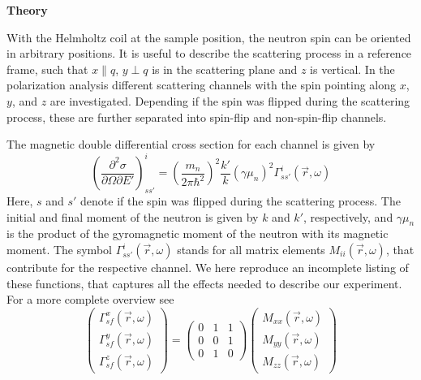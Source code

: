 \vspace{10 pt}
\noindent
{\bf Theory}

\noindent
%
With the Helmholtz coil at the sample position, the neutron spin can be
oriented in arbitrary positions. It is useful to describe the scattering
process in a reference frame, such that $x\parallel q$, $y\perp q$ is in the
scattering plane and $z$ is vertical.
%
In the polarization analysis different scattering channels with the spin
pointing along $x$, $y$, and $z$ are investigated. Depending if the spin was flipped
during the scattering process, these are further separated
into spin-flip and non-spin-flip channels.

\noindent
The magnetic double differential cross section for each channel is given by
\cite{Schaerpf_1993}
%
\begin{equation}
  \left(\frac{\partial^2\sigma}{\partial \Omega \partial E'}\right)_{ss'}^{i}
  = \left( \frac{m_n}{2\pi\hbar^2}\right)^2 \frac{k'}{k} (\gamma \mu_n)^2
    \Gamma_{ss'}^{i}(\vec{r},\omega)
\end{equation}
%
Here, $s$ and $s'$
denote if the spin was flipped during the scattering process. The initial and
final moment of the neutron is given by $k$ and $k'$, respectively, and $\gamma
\mu_n$ is the product of the gyromagnetic moment of the neutron with its
magnetic moment. The symbol $\Gamma_{ss'}^{i}(\vec{r},\omega)$ stands for all
matrix elements $M_{ii}(\vec{r},\omega)$, that contribute for the respective
channel. We here reproduce an incomplete listing of these functions, that
captures all the effects needed to describe our experiment. For a more complete
overview see \cite{Schaerpf_1993}
%
\begin{equation}
  \begin{pmatrix}
    \Gamma_{sf}^x (\vec{r},\omega)\\
    \Gamma_{sf}^y (\vec{r},\omega)\\
    \Gamma_{sf}^ z (\vec{r},\omega)
  \end{pmatrix}
  =
  \begin{pmatrix}
    0 & 1 & 1 \\
    0 & 0 & 1 \\ 
    0 & 1 & 0 
  \end{pmatrix}
  \begin{pmatrix}
    M_{xx}(\vec{r},\omega) \\
    M_{yy}(\vec{r},\omega) \\
    M_{zz}(\vec{r},\omega)
  \end{pmatrix}
\end{equation}
